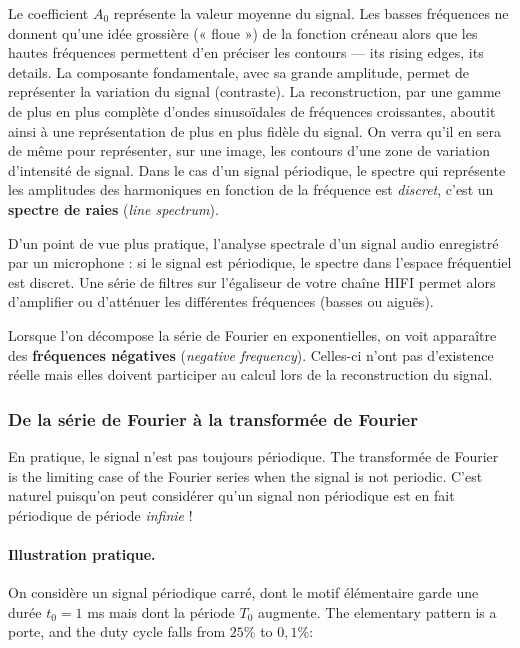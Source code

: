 \begin{conclusion}
  Le coefficient $A_0$ représente la valeur moyenne du signal. Les basses
  fréquences ne donnent qu'une idée grossière (« floue ») de la fonction créneau
  alors que les hautes fréquences permettent d'en préciser les contours --- its
  rising edges, its details. La composante fondamentale, avec sa grande
  amplitude, permet de représenter la variation du signal (contraste). La
  reconstruction, par une gamme de plus en plus complète d'ondes sinusoïdales de
  fréquences croissantes, aboutit ainsi à une représentation de plus en plus
  fidèle du signal. On verra qu'il en sera de même pour représenter, sur une
  image, les contours d'une zone de variation d'intensité de signal. Dans le cas
  d'un signal périodique, le spectre qui représente les amplitudes des
  harmoniques en fonction de la fréquence est \emph{discret}, c'est un
  \textbf{spectre de raies} (\textit{line spectrum}).
\end{conclusion}

D'un point de vue plus pratique, l'analyse spectrale d'un signal audio
enregistré par un microphone : si le signal est périodique, le spectre dans
l'espace fréquentiel est discret. Une série de filtres sur l'égaliseur de votre
chaîne HIFI permet alors d'amplifier ou d'atténuer les différentes fréquences
(basses ou aiguës).

\begin{remark}
  Lorsque l'on décompose la série de Fourier en exponentielles, on voit
  apparaître des \textbf{fréquences négatives} (\textit{negative frequency}).
  Celles-ci n'ont pas d'existence réelle mais elles doivent participer au calcul
  lors de la reconstruction du signal.
\end{remark}

\subsubsection{De la série de Fourier à la transformée de Fourier}

En pratique, le signal n'est pas toujours périodique. The transformée de Fourier
is the limiting case of the Fourier series when the signal is not periodic. C'est
naturel puisqu'on peut considérer qu'un signal non périodique est en fait
périodique de période \emph{infinie} !

\paragraph{Illustration pratique.} On considère un signal périodique carré, dont
le motif élémentaire garde une durée $t_0=1$ ms mais dont la période $T_0$
augmente. The elementary pattern is a porte, and the duty cycle falls from
$25\%$ to $0{,}1\%$:

